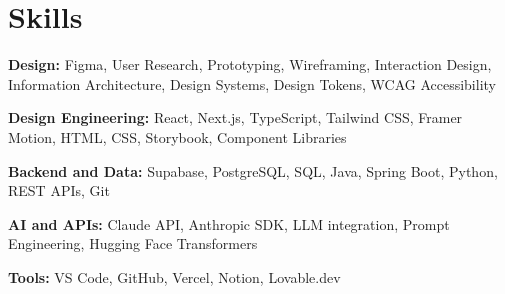 \documentclass[11pt, letterpaper]{article}
\begin{document}
\section{Skills}

\textbf{Design:}
Figma, User Research, Prototyping, Wireframing, Interaction Design,
Information Architecture, Design Systems, Design Tokens, WCAG Accessibility

\vspace{4pt}
\textbf{Design Engineering:}
React, Next.js, TypeScript, Tailwind CSS, Framer Motion, HTML, CSS,
Storybook, Component Libraries

\vspace{4pt}
\textbf{Backend and Data:}
Supabase, PostgreSQL, SQL, Java, Spring Boot, Python, REST APIs, Git

\vspace{4pt}
\textbf{AI and APIs:}
Claude API, Anthropic SDK, LLM integration, Prompt Engineering,
Hugging Face Transformers

\vspace{4pt}
\textbf{Tools:}
VS Code, GitHub, Vercel, Notion, Lovable.dev

\end{document}
